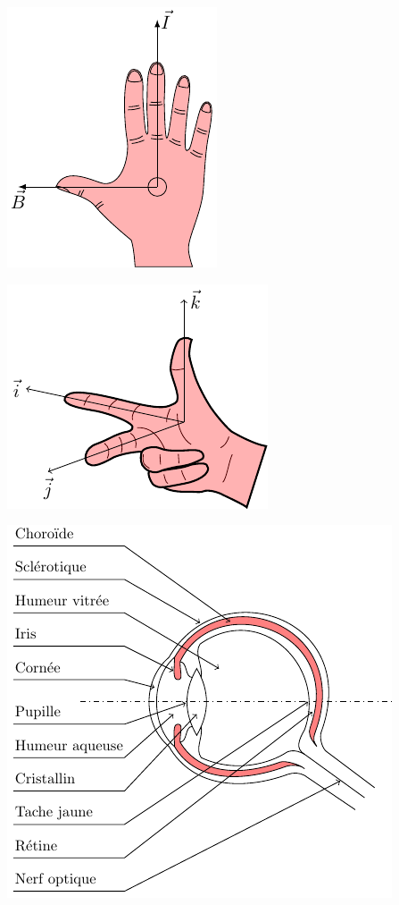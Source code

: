     \vfill
    \begin{minipage}{0.475\linewidth}\centering
            \includegraphics{./TikZimages/TikZ4.pdf}
        \end{minipage}\hfill\begin{minipage}{0.475\linewidth}\centering
            \includegraphics{./TikZimages/TikZ6.pdf}\\
    \end{minipage}

    \vfill
    \begin{minipage}{\linewidth}\centering
    \includegraphics{./TikZimages/TikZ5.pdf}\\
    \end{minipage}

